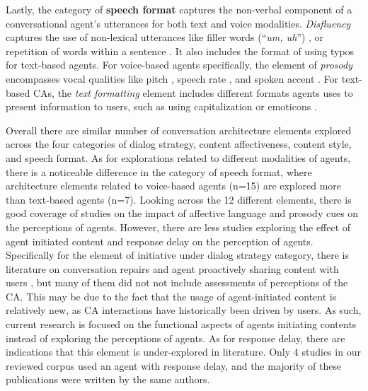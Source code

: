 Lastly, the category of \textbf{speech format} captures the non-verbal component of a conversational agent's utterances for both text and voice modalities. \textit{Disfluency} captures 
the use of non-lexical utterances like filler words (``\textit{um, uh}'') \cite{hu2021enhancing, jeong2019exploring}\cmt{[56][10]}, or repetition of words within a sentence \cite{yang2021effect}\cmt{[72]}. It also includes the format of using typos \cite{westerman2019believe}\cmt{[9]} for text-based agents. For voice-based agents specifically, the element of \textit{prosody} encompasses vocal qualities like pitch \cite{habler2019effects, jestin2022effects}\cmt{[63][81]}, speech rate \cite{choi2020nobody}\cmt{[54]}, and spoken accent \cite{feijoo2021effects}\cmt{[70]}. For text-based CAs, the \textit{text formatting} element includes different formats agents uses to present information to users, such as using capitalization \cite{westerman2019believe}\cmt{[9]} or emoticons \cite{kim2019comparing, wilhelm2022keep}\cmt{[89][28]}. 

Overall there are similar number of conversation architecture elements explored across the four categories of dialog strategy, content affectiveness, content style, and speech format. As for explorations related to different modalities of agents, there is a noticeable difference in the category of speech format, where architecture elements related to voice-based agents (n=15) are explored more than text-based agents (n=7). Looking across the 12 different elements, there is good coverage of studies on the impact of affective language and prosody cues on the perceptions of agents. However, there are less studies exploring the effect of agent initiated content and response delay on the perception of agents. Specifically for the element of initiative under dialog strategy category, there is literature on conversation repairs \cite{komatani2010online, reinkemeier2022repair} and agent proactively sharing content with users \cite{dubiel2019inquisitive, zargham2022understanding}, but many of them did not not include assessments of perceptions of the CA. This may be due to the fact that the usage of agent-initiated content is relatively new, as CA interactions have historically been driven by users. As such, current research is focused on the functional aspects of agents initiating contents instead of exploring the perceptions of agents. As for response delay, there are indications that this element is under-explored in literature. Only 4 studies in our reviewed corpus used an agent with response delay, and the majority of these publications were written by the same authors.


